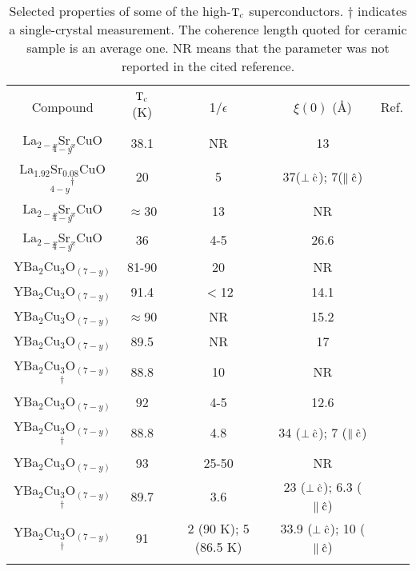 \begin{table}
\begin{center}
\caption[Selected properties of some of the high-$\rm T_c$
superconductors]{Selected  properties  of  some   of  the   high-$\rm  T_c$
superconductors.  $\dagger$  indicates a  single-crystal  measurement.  The
coherence  length quoted  for ceramic sample  is an average  one.  NR means
that the parameter was not reported in the cited reference.}
\label{hitctable}
\begin{tabular}{|ccccc|}
\hline
& & & & \\
Compound& $\rm T_c$ (K)& 1/$\epsilon$ & $\xi(0)$ (\AA)& Ref. \\
& & & & \\
\hline
La$_{2-x}$Sr$_x$CuO$_{4-y}$ & 38.1 & NR & 13 & \cite{orlando87b}\\
La$_{1.92}$Sr$_{0.08}$CuO$_{4-y}$$^{\dagger}$ & 20  & 5 & 37($\rm \perp \hat{c}$); 7($\rm \parallel \hat{c}$) & \cite{iye88}\\
La$_{2-x}$Sr$_x$CuO$_{4-y}$ & $\approx$30 & 13 & NR  & \cite{uchida87}\\
La$_{2-x}$Sr$_x$CuO$_{4-y}$ & 36 & 4-5 & 26.6 & \cite{vanbentum87}\\
YBa$_2$Cu$_3$O$_{(7-y)}$ & 81-90 & 20 & NR & \cite{mcguire87}\\
YBa$_2$Cu$_3$O$_{(7-y)}$ & 91.4 & $<$12 & 14.1 & \cite{orlando87}\\
YBa$_2$Cu$_3$O$_{(7-y)}$ & $\approx$90 & NR & 15.2 & \cite{rettori87}\\
YBa$_2$Cu$_3$O$_{(7-y)}$ & 89.5 & NR & 17 & \cite{orlando87a}\\
YBa$_2$Cu$_3$O$_{(7-y)}$$^{\dagger}$ & 88.8 &10  & NR & \cite{dinger87}\\
YBa$_2$Cu$_3$O$_{(7-y)}$ & 92 & 4-5 & 12.6 & \cite{vanbentum87}\\
YBa$_2$Cu$_3$O$_{(7-y)}$$^{\dagger}$ & 88.8 & 4.8 &34 ($\rm \perp \hat{c}$); 7 ($\rm \parallel \hat{c}$)  & \cite{worthington87}\\ 
YBa$_2$Cu$_3$O$_{(7-y)}$ & 93 & 25-50 & NR & \cite{welch87}\\
YBa$_2$Cu$_3$O$_{(7-y)}$$^{\dagger}$ & 89.7 & 3.6 & 23 ($\rm \perp \hat{c}$); 6.3 ($\rm \parallel \hat{c}$)  & \cite{moodera88}\\ 
YBa$_2$Cu$_3$O$_{(7-y)}$$^{\dagger}$ & 91 & 2 (90 K); 5 (86.5 K) & 33.9 ($\rm \perp \hat{c}$); 10 ($\rm \parallel \hat{c}$)  & \cite{iye87}\\ 
$$
\end{tabular}
\end{center}
\end{table}
